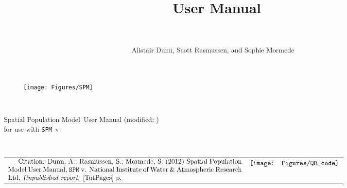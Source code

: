 \documentclass[a4paper,11pt,twoside,pdftex]{article}
\title{\SPMName\ User Manual \\\SPM\ \VER} %
\author{Alistair Dunn, Scott Rasmussen, and Sophie Mormede}  %
\date{\DocDate} %
\newcommand{\DocYear}{\SourceControlYearDoc}
\newcommand{\DocVer}{\SourceControlDateDoc}
\newcommand{\VER}{v} %
\newcommand{\SPM}{\texttt{SPM}} %
\newcommand{\SPMName}{Spatial Population Model} %
\newcommand{\Organisation}{National Institute of Water \& Atmospheric Research Ltd.} %
\newcommand{\ManualRef}{Dunn, A.; Rasmussen, S.; Mormede, S. (\DocYear) \SPMName\ User Manual, \SPM\ \VER. \Organisation\ \emph{Unpublished report}. \ref{TotPages} p.} %
\let\origdoublepage\cleardoublepage
\newcommand{\clearemptydoublepage}{%
  \clearpage
  {\pagestyle{empty}\origdoublepage}%
}
\begin{document}
\sloppy %

\maketitle
\thispagestyle{empty} %

\vspace{3cm}
\begin{figure}[htp]
  \begin{center}
   \texttt{[image: Figures/SPM]}
  \end{center}
\end{figure}

~\vfill
\begin{center}
  \SPMName\ User Manual (modified: \DocVer) \\ for use with \SPM\ \VER
\end{center}


\cleardoublepage{}
\fancyfoot[C]{\thepage}
~\vfill

\begin{tabulary}{\textwidth}{L C}        
$\vcenter{Citation: \ManualRef}$ & $\vcenter{\hbox{\texttt{[image: Figures/QR\_code]}}}$\\
\end{tabulary}


\clearemptydoublepage{}
\begin{spacing}{0.8} %
\tableofcontents
\end{spacing}


\end{document}
